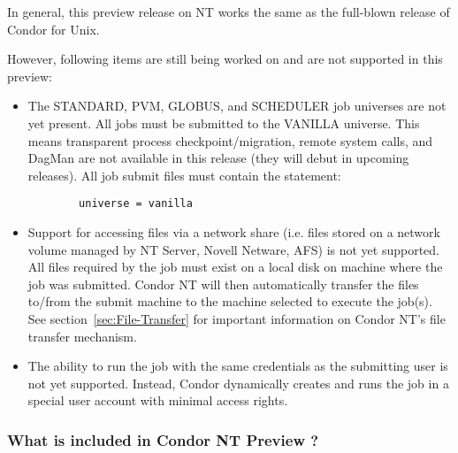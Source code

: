 In general, this preview release on NT works the same as the full-blown
release of Condor for Unix.  

However,
following items are still being worked on and are not supported in this
preview:

\begin{itemize}

\item The STANDARD, PVM, GLOBUS, and SCHEDULER job universes are not yet present.
All jobs must be submitted to the VANILLA universe.
This means transparent process checkpoint/migration, remote system calls,
and DagMan are not available in this release (they will debut in
upcoming releases).  All job submit files must contain the statement:
\begin{verbatim}
        universe = vanilla
\end{verbatim}

\item Support for accessing files via a network share (i.e. files stored on
a network volume managed by NT Server, Novell Netware, AFS) is not yet
supported.  All files required by the job must exist on a local disk on
machine where the job was submitted.  Condor NT will then automatically
transfer the files to/from the submit machine to the machine selected to
execute the job(s).  See section~\ref{sec:File-Transfer} for important
information on Condor NT's file transfer mechanism.

\item The ability to run the job with the same credentials as the submitting
user is not yet supported.  Instead, Condor dynamically creates and runs the
job in a special user account with minimal access rights.

\end{itemize}

\subsubsection{What is included in Condor NT Preview \VersionNotice?}

